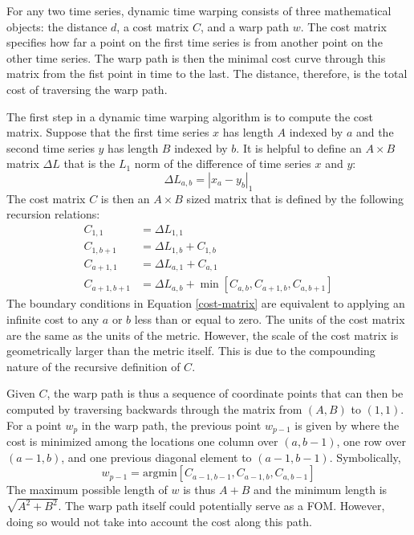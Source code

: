 \documentclass{ntmanuscript}
\newcommand{\argmin}{\mathrm{argmin}}
\begin{document}
For any two time series, dynamic time warping consists of three mathematical objects:
the distance $d$, a cost matrix $C$, and a warp path $w$. The cost matrix
specifies how far a point on the first time series is from another point on the
other time series.  The warp path is then the minimal cost curve through this
matrix from the fist point in time to the last. The distance, therefore, is the
total cost of traversing the warp path.

The first step in a dynamic time warping algorithm is to compute the cost matrix.
Suppose that the first
time series $x$ has length $A$ indexed by $a$ and the second time series $y$ has
length $B$ indexed by $b$. It is helpful to define an $A\times B$ matrix $\Delta L$
that is the $L_1$ norm of the difference of time series $x$ and $y$:
\begin{equation}
\label{delta-l1}
\Delta L_{a,b} = \left|x_a - y_b\right|_1
\end{equation}
The cost matrix $C$ is then an $A\times B$ sized matrix that is defined by the
following recursion relations:
\begin{equation}
\label{cost-matrix}
\begin{split}
C_{1,1} & = \Delta L_{1,1}\\
C_{1,b+1} & = \Delta L_{1,b} + C_{1,b}\\
C_{a+1,1} & = \Delta L_{a,1} + C_{a,1}\\
C_{a+1,b+1} & = \Delta L_{a,b} + \min\left[C_{a,b}, C_{a+1,b}, C_{a,b+1}\right]
\end{split}
\end{equation}
The boundary conditions in Equation \ref{cost-matrix} are equivalent
to applying an infinite cost to any $a$ or $b$ less than or equal to zero.
The units of the cost matrix are the same as the units of the metric. However, the
scale of the cost matrix is geometrically larger than the metric itself. This is
due to the compounding nature of the recursive definition of $C$.

Given $C$, the warp path is thus a sequence of coordinate points that can then be
computed by traversing backwards through the matrix from $(A, B)$ to $(1, 1)$.
For a point $w_p$ in the warp path, the previous point $w_{p-1}$ is given by
where the cost is minimized among the locations one column over $(a,b-1)$,
one row over $(a-1,b)$, and one previous diagonal element to $(a-1,b-1)$.
Symbolically,
\begin{equation}
\label{warp-path}
w_{p-1} = \argmin\left[C_{a-1,b-1}, C_{a-1,b}, C_{a,b-1}\right]
\end{equation}
The maximum possible length of $w$ is thus $A + B$ and the minimum length is
$\sqrt{A^2 + B^2}$. The warp path itself could potentially serve as a FOM.
However, doing so would not take into account the cost along this path.
\end{document}
